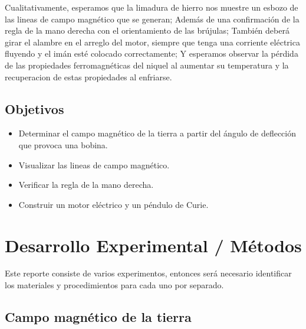 \documentclass[article,12pt]{elsarticle}
\begin{document}
    Cualitativamente, esperamos que la limadura de hierro nos muestre un esbozo de las lineas de campo magnético que se generan; Además de una confirmación de la regla de la mano derecha con el orientamiento de las brújulas; También deberá girar el alambre en el arreglo del motor, siempre que tenga una corriente eléctrica fluyendo y el imán esté colocado correctamente; Y esperamos observar la pérdida de las propiedades ferromagnéticas del niquel al aumentar su temperatura y la recuperacion de estas propiedades al enfriarse.
    \subsection{Objetivos}
    \begin{itemize}
        \item Determinar el campo magnético de la tierra a partir del ángulo de deflección que provoca una bobina. 
        \item Visualizar las lineas de campo magnético.
        \item Verificar la regla de la mano derecha.
        \item Construir un motor eléctrico y un péndulo de Curie.
    \end{itemize} 
\section{Desarrollo Experimental / Métodos}
Este reporte consiste de varios experimentos, entonces será necesario identificar los materiales y procedimientos para cada uno por separado.
    \subsection{Campo magnético de la tierra}
\end{document}
